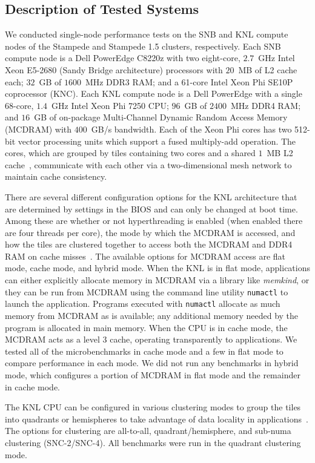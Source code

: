\subsection{Description of Tested Systems}

We conducted single-node performance tests on the SNB and KNL compute nodes of the
Stampede and Stampede 1.5 clusters, respectively. Each SNB compute node
is a Dell PowerEdge C8220z with two eight-core, $2.7$~GHz Intel Xeon E5-2680 (Sandy Bridge
architecture) processors with $20$~MB of L2 cache each; $32$~GB of $1600$~MHz DDR3 RAM;
and a 61-core Intel Xeon Phi SE10P coprocessor (KNC). Each KNL compute node is
a Dell PowerEdge with a single 68-core, $1.4$~GHz Intel Xeon Phi 7250 CPU;
$96$~GB of $2400$~MHz DDR4 RAM; and $16$~GB of on-package Multi-Channel
Dynamic Random Access Memory (MCDRAM) with $400$~GB/s bandwidth. Each of the Xeon Phi
cores has two 512-bit vector processing units which support a fused multiply-add
operation. The cores, which are grouped by tiles containing two cores and a shared $1$~MB
L2 cache~\cite{intel:xeonphi}, communicate with each other via a two-dimensional mesh
network to maintain cache consistency.

There are several different configuration options for the KNL architecture that are
determined by settings in the BIOS and can only be changed at boot time. Among these are
whether or not hyperthreading is enabled (when enabled there are four threads per core), the mode by
which the MCDRAM is accessed, and how the tiles are clustered together to access both the
MCDRAM and DDR4 RAM on cache misses~\cite{vladimirov:knlModes, asai:mcdramKnl}.  The
available options for MCDRAM access are flat mode, cache mode, and hybrid mode.  When the
KNL is in flat mode, applications can either explicitly allocate memory in MCDRAM via a
library like \textit{memkind}, or they can be run from MCDRAM using the command line
utility \texttt{numactl} to launch the application. Programs executed with
\texttt{numactl} allocate as much memory from MCDRAM as is available; any additional
memory needed by the program is allocated in main memory. When the CPU is in cache mode,
the MCDRAM acts as a level 3 cache, operating transparently to applications. We tested all
of the microbenchmarks in cache mode and a few in flat mode to compare performance in each
mode. We did not run any benchmarks in hybrid mode, which configures a portion of MCDRAM
in flat mode and the remainder in cache mode.

The KNL CPU can be configured in various clustering modes to group the tiles into
quadrants or hemispheres to take advantage of data locality in
applications~\cite{vladimirov:knlModes}. The options for clustering are all-to-all,
quadrant/hemisphere, and sub-numa clustering (SNC-2/SNC-4). All benchmarks were run in the
quadrant clustering mode.

